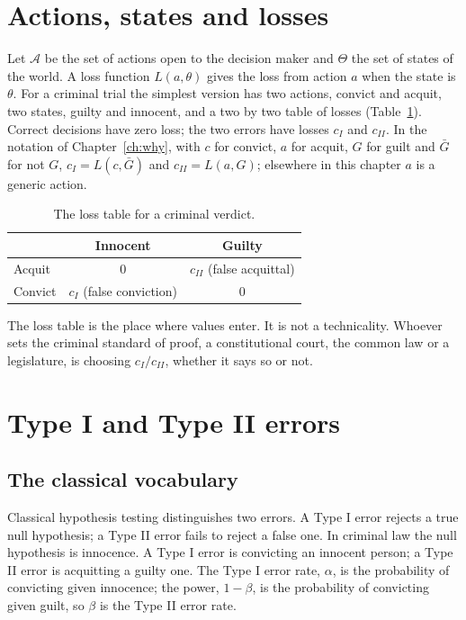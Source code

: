 \section{Actions, states and losses}

Let $\mathcal{A}$ be the set of actions open to the decision maker and $\Theta$ the set of states of the world. A loss function $L(a,\theta)$ gives the loss from action $a$ when the state is $\theta$. For a criminal trial the simplest version has two actions, convict and acquit, two states, guilty and innocent, and a two by two table of losses (Table~\ref{tab:loss}). Correct decisions have zero loss; the two errors have losses $c_I$ and $c_{II}$. In the notation of Chapter~\ref{ch:why}, with $c$ for convict, $a$ for acquit, $G$ for guilt and $\bar G$ for not $G$, $c_I = L(c,\bar G)$ and $c_{II} = L(a,G)$; elsewhere in this chapter $a$ is a generic action.

\begin{table}[ht]
\centering\small
\begin{tabular}{lcc}
\toprule
& Innocent & Guilty\\
\midrule
Acquit & $0$ & $c_{II}$ (false acquittal)\\
Convict & $c_{I}$ (false conviction) & $0$\\
\bottomrule
\end{tabular}
\caption{The loss table for a criminal verdict.}
\label{tab:loss}
\end{table}

The loss table is the place where values enter. It is not a technicality. Whoever sets the criminal standard of proof, a constitutional court, the common law or a legislature, is choosing $c_I/c_{II}$, whether it says so or not.

\section{Type I and Type II errors}

\subsection{The classical vocabulary}

Classical hypothesis testing distinguishes two errors. A Type I error rejects a true null hypothesis; a Type II error fails to reject a false one. In criminal law the null hypothesis is innocence. A Type I error is convicting an innocent person; a Type II error is acquitting a guilty one. The Type I error rate, $\alpha$, is the probability of convicting given innocence; the power, $1-\beta$, is the probability of convicting given guilt, so $\beta$ is the Type II error rate.

